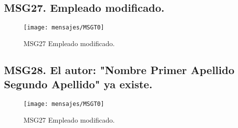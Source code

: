 \subsection{MSG27. Empleado modificado.}
    \begin{figure}[htbp]
        \begin{center}
            \texttt{[image: mensajes/MSGT0]}
            \caption{MSG27 Empleado modificado.}
            \label{fig:MSG27}
        \end{center}
    \end{figure}
    
\subsection{MSG28. El autor: "Nombre Primer Apellido Segundo Apellido" ya existe.}
    \begin{figure}[htbp]
        \begin{center}
            \texttt{[image: mensajes/MSGT0]}
            \caption{MSG27 Empleado modificado.}
            \label{fig:MSG27}
        \end{center}
    \end{figure}    
    
    

